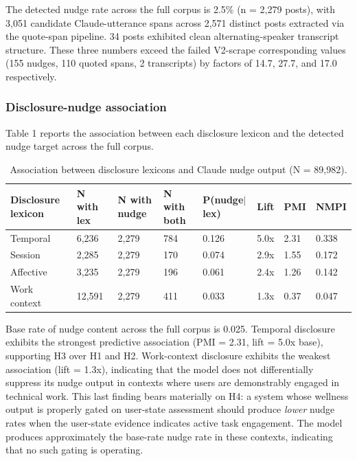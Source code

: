 \documentclass[11pt]{article}
\begin{document}
The detected nudge rate across the full corpus is 2.5\% (n = 2,279 posts), with 3,051 candidate Claude-utterance spans across 2,571 distinct posts extracted via the quote-span pipeline. 34 posts exhibited clean alternating-speaker transcript structure. These three numbers exceed the failed V2-scrape corresponding values (155 nudges, 110 quoted spans, 2 transcripts) by factors of 14.7, 27.7, and 17.0 respectively.

\subsubsection{Disclosure-nudge association}

Table 1 reports the association between each disclosure lexicon and the detected nudge target across the full corpus.

\begin{table}[h]
\caption{Association between disclosure lexicons and Claude nudge output (N = 89,982).}
\centering
\begin{tabular}{llllllll}
\toprule
Disclosure lexicon & N with lex & N with nudge & N with both & P(nudge$\vert$lex) & Lift & PMI & NMPI \\
\midrule
Temporal & 6,236 & 2,279 & 784 & 0.126 & 5.0x & 2.31 & 0.338 \\
Session & 2,285 & 2,279 & 170 & 0.074 & 2.9x & 1.55 & 0.172 \\
Affective & 3,235 & 2,279 & 196 & 0.061 & 2.4x & 1.26 & 0.142 \\
Work context & 12,591 & 2,279 & 411 & 0.033 & 1.3x & 0.37 & 0.047 \\
\bottomrule
\end{tabular}
\end{table}

Base rate of nudge content across the full corpus is 0.025. Temporal disclosure exhibits the strongest predictive association (PMI = 2.31, lift = 5.0x base), supporting H3 over H1 and H2. Work-context disclosure exhibits the weakest association (lift = 1.3x), indicating that the model does not differentially suppress its nudge output in contexts where users are demonstrably engaged in technical work. This last finding bears materially on H4: a system whose wellness output is properly gated on user-state assessment should produce \emph{lower} nudge rates when the user-state evidence indicates active task engagement. The model produces approximately the base-rate nudge rate in these contexts, indicating that no such gating is operating.
\end{document}
